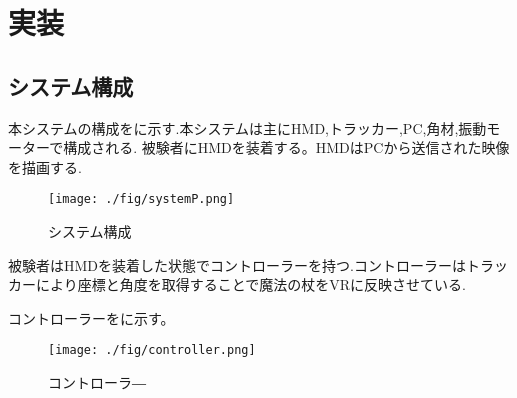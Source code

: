 \chapter{実装}
\section{システム構成}

本システムの構成をに示す.本システムは主にHMD,トラッカー,PC,角材,振動モーターで構成される.
被験者にHMDを装着する。HMDはPCから送信された映像を描画する.

\begin{figure}[b]
\centering
\texttt{[image: ./fig/systemP.png]}
\caption{システム構成}\label{sys}
\end{figure}

被験者はHMDを装着した状態でコントローラーを持つ.コントローラーはトラッカーにより座標と角度を取得することで魔法の杖をVRに反映させている.

コントローラーをに示す。
\begin{figure}[b]
\centering
\texttt{[image: ./fig/controller.png]}
\caption{コントローラ―}\label{controller}
\end{figure}







\begin{comment}
    \begin{textblock}{2}(1, 16.5)
        空行→
    \end{textblock}
    
    \begin{textblock}{2}(1, 18.5)
        字下げ→
    \end{textblock}
        
    \begin{textblock}{2}(1, 20.5)
        空行→
    \end{textblock}
    
    \begin{textblock}{11}(9, 20.5)
        ←読点までが元の文なので文献番号はその後につける
    \end{textblock}
    
    \begin{textblock}{7}(14, 26.5)
        ↑同じく読点までが元の文なので
    
        "」"と文献番号はその後につける
    \end{textblock}
\end{comment}




\begin{comment}
    \begin{textblock}{11}(9, 7.5)
        \noindent
        ↑間接引用では節末・文末の句読点の「前」に文献番号をつける
    \end{textblock}
\end{comment}




